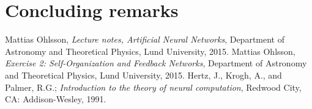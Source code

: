 \documentclass[a4paper,12pt]{article}
\theoremstyle{plain}
\theoremstyle{definition}
\begin{document}
      
      
   
   \section{Concluding remarks}

   \begin{thebibliography}{99}
     Mattias Ohlsson,
     \emph{Lecture notes, Artificial Neural Networks},
     Department of Astronomy and Theoretical Physics,
     Lund University,
     2015.
     Mattias Ohlsson,
     \emph{Exercise 2: Self-Organization and Feedback Networks},
     Department of Astronomy and Theoretical Physics,
     Lund University,
     2015.
      Hertz, J., Krogh, A., and Palmer, R.G.;
      \emph{Introduction to the theory of neural computation}, 
      Redwood City, CA: 
      Addison-Wesley,
      1991. 

\end{thebibliography}
\end{document}
